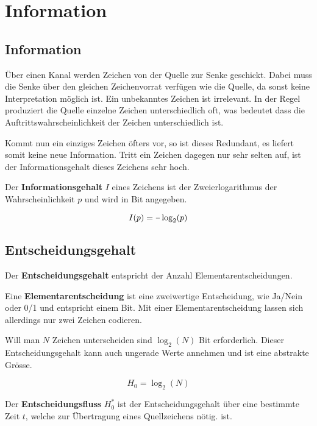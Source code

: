 \section{Information}

\subsection{Information}
 
Über einen Kanal werden Zeichen von der Quelle zur Senke geschickt. Dabei muss
die Senke über den gleichen Zeichenvorrat verfügen wie die Quelle, da sonst
keine Interpretation möglich ist. Ein unbekanntes Zeichen ist irrelevant. In der
Regel produziert die Quelle einzelne Zeichen unterschiedlich oft, was bedeutet
dass die Auftrittswahrscheinlichkeit der Zeichen unterschiedlich ist. 

Kommt nun ein einziges Zeichen öfters vor, so ist dieses Redundant, es liefert
somit keine neue Information. Tritt ein Zeichen dagegen nur sehr selten auf, ist
der Informationsgehalt dieses Zeichens sehr hoch. 

Der \textbf{Informationsgehalt} $I$ eines Zeichens ist der Zweierlogarithmus der
Wahrscheinlichkeit $p$ und wird in Bit angegeben.

\begin{displaymath}
	I(p) = \unaryminus \log_2(p)
\end{displaymath}


\subsection{Entscheidungsgehalt}

Der \textbf{Entscheidungsgehalt} entspricht der Anzahl Elementarentscheidungen.

Eine \textbf{Elementarentscheidung} ist eine zweiwertige Entscheidung, wie
Ja/Nein oder 0/1 und entspricht einem Bit. Mit einer Elementarentscheidung
lassen sich allerdings nur zwei Zeichen codieren. 

Will man $N$ Zeichen unterscheiden sind $\log_2(N)$ Bit erforderlich. Dieser
Entscheidungsgehalt kann auch ungerade Werte annehmen und ist eine abstrakte
Grösse.

\begin{displaymath}
	H_0=\log_2(N)
\end{displaymath}

Der \textbf{Entscheidungsfluss} $H^*_0$ ist der Entscheidungsgehalt über eine
bestimmte Zeit $t$, welche zur Übertragung eines Quellzeichens nötig. ist.

